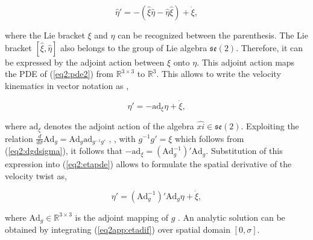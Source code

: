 \begin{equation}
    \hat{\eta}' = -(\hat{\xi}\hat{\eta} - \hat{\eta}\hat{\xi}) + \Dot{\xi},
        \label{eq2:pde2}
\end{equation}

where the Lie bracket $\xi$ and $\eta$ can be recognized between the parenthesis. The Lie bracket $[\hat{\xi},\hat{\eta}]$ also belongs to the group of Lie algebra $\mathfrak{se}(2)$. Therefore, it can be expressed by the adjoint action between $\xi$ onto $\eta$. This adjoint action maps the PDE of (\ref{eq2:pde2}) from $\mathbb{R}^{3\times 3}$ to $\mathbb{R}^3$. This allows to write the velocity kinematics in vector notation as \cite{Caasenbrood2020},

\begin{equation}
    \eta'= -\text{ad}_\xi \eta + \Dot{\xi},
    \label{eq2:etapde}
\end{equation}

where $\text{ad}_\xi$ denotes the adjoint action of the algebra $\hat{xi} \in \mathfrak{se}(2)$. Exploiting the relation $\frac{d}{d \sigma} \text{Ad}_g = \text{Ad}_g \text{ad}_{g^{-1}g'}$ \cite{Boyer2019}, \cite{traversaro2016multibody}, with $g^{-1}g' = \xi$ which follows from (\ref{eq2:dgdsigma}), it follows that $-\text{ad}_\xi = (\text{Ad}_g^{-1})'\text{Ad}_g$. Substitution of this expression into (\ref{eq2:etapde}) allows to formulate the spatial derivative of the velocity twist as,

\begin{equation}
    \eta'= (\text{Ad}_g^{-1})'\text{Ad}_g \eta + \Dot{\xi},
    \label{eq2app:etadif}
\end{equation}

where $\text{Ad}_g \in \mathbb{R}^{3 \times 3}$ is the adjoint mapping of $g$ \cite{Sola2018}. An analytic solution can be obtained by integrating (\ref{eq2app:etadif}) over spatial domain $[0,\sigma]$. 